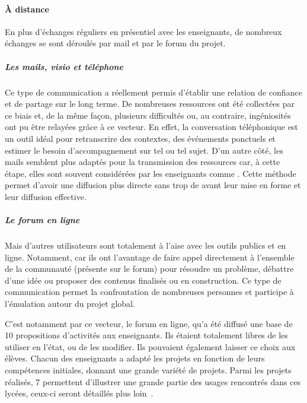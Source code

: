         \paragraph{À distance}\label{sec:mail}
            En plus d’échanges réguliers en présentiel avec les enseignants, de nombreux échanges se sont déroulés par mail et par le forum du projet.
            \subparagraph{Les mails, visio et téléphone} Ce type de communication a réellement permis d'établir une relation de confiance et de partage sur le long terme. De nombreuses ressources ont été collectées par ce biais et, de la même façon, plusieurs difficultés ou, au contraire, ingéniosités ont pu être relayées grâce à ce vecteur. En effet, la conversation téléphonique est un outil idéal pour retranscrire des contextes, des événements ponctuels et estimer le besoin d'accompagnement sur tel ou tel sujet. D'un autre côté, les mails semblent plus adaptés pour la transmission des ressources car, à cette étape, elles sont souvent considérées par les enseignants comme . Cette méthode permet d'avoir une diffusion plus directe sans trop de  avant leur mise en forme et leur diffusion effective.
            \subparagraph{Le forum en ligne} Mais d'autres utilisateurs sont totalement à l'aise avec les outils publics et en ligne. Notamment, car ils ont l'avantage de faire appel directement à l'ensemble de la communauté (présente sur le forum) pour résoudre un problème, débattre d'une idée ou proposer des contenus finalisés ou en construction. Ce type de communication permet la confrontation de nombreuses personnes et participe à l'émulation autour du projet global.\par%
        \label{sec:ucd_prop}
            C'est notamment par ce vecteur, le forum en ligne, qu'a été diffusé une base de 10 propositions d'activités aux enseignants. Ils étaient totalement libres de les utiliser en l'état, ou de les modifier. Ils pouvaient également laisser ce choix aux élèves. Chacun des enseignants a adapté les projets en fonction de leurs compétences initiales, donnant une grande variété de projets. Parmi les projets réalisés, 7 permettent d'illustrer une grande partie des usages rencontrés dans ces lycées, ceux-ci seront détaillés plus loin~.
